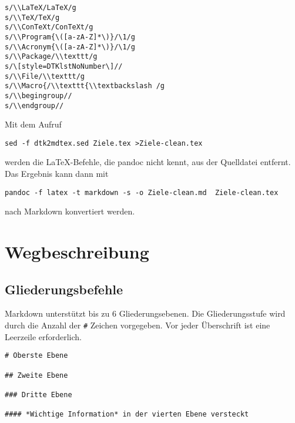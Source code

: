 \documentclass[11pt,ngerman,a4paper]{article}
\begin{document}
\begin{verbatim}
s/\\LaTeX/LaTeX/g
s/\\TeX/TeX/g
s/\\ConTeXt/ConTeXt/g
s/\\Program{\([a-zA-Z]*\)}/\1/g
s/\\Acronym{\([a-zA-Z]*\)}/\1/g
s/\\Package/\\texttt/g
s/\[style=DTKlstNoNumber\]//
s/\\File/\\texttt/g
s/\\Macro{/\\texttt{\\textbackslash /g
s/\\begingroup//
s/\\endgroup//
\end{verbatim}

Mit dem Aufruf

\begin{verbatim}
sed -f dtk2mdtex.sed Ziele.tex >Ziele-clean.tex
\end{verbatim}

werden die LaTeX-Befehle, die pandoc nicht kennt, aus der Quelldatei
entfernt. Das Ergebnis kann dann mit

\begin{verbatim}
pandoc -f latex -t markdown -s -o Ziele-clean.md  Ziele-clean.tex
\end{verbatim}

nach Markdown konvertiert werden.

\section{Wegbeschreibung}

\subsection{Gliederungsbefehle}

Markdown unterstützt bis zu 6 Gliederungsebenen. Die Gliederungsstufe
wird durch die Anzahl der \texttt{\#} Zeichen vorgegeben. Vor jeder
Überschrift ist eine Leerzeile erforderlich.

\begin{verbatim}
# Oberste Ebene

## Zweite Ebene

### Dritte Ebene

#### *Wichtige Information* in der vierten Ebene versteckt
\end{verbatim}
\end{document}
